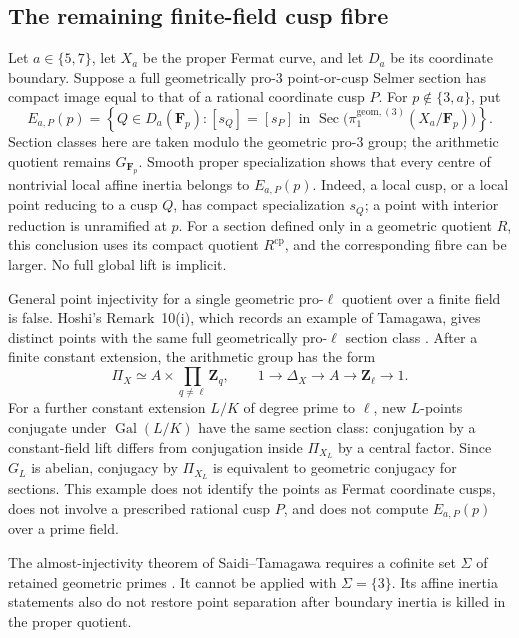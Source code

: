 \subsection{The remaining finite-field cusp fibre}

Let \(a\in\{5,7\}\), let \(X_a\) be the proper Fermat curve, and let
\(D_a\) be its coordinate boundary. Suppose a full geometrically
pro-\(3\) point-or-cusp Selmer section has compact image equal to that
of a rational coordinate cusp \(P\). For \(p\notin\{3,a\}\), put
\[
 E_{a,P}(p)=
 \left\{Q\in D_a(\mathbf F_p):
 [s_Q]=[s_P]\text{ in }
 \operatorname{Sec}\bigl(\pi_1^{\mathrm{geom},(3)}
             (X_a/\mathbf F_p)\bigr)\right\}.
\]
Section classes here are taken modulo the geometric pro-\(3\) group;
the arithmetic quotient remains \(G_{\mathbf F_p}\).
Smooth proper specialization shows that every centre of nontrivial
local affine inertia belongs to \(E_{a,P}(p)\). Indeed, a local cusp,
or a local point reducing to a cusp \(Q\), has compact specialization
\(s_Q\); a point with interior reduction is unramified at \(p\).
For a section defined only in a geometric quotient \(R\), this
conclusion uses its compact quotient \(R^{\mathrm{cp}}\), and the
corresponding fibre can be larger. No full global lift is implicit.

General point injectivity for a single geometric pro-\(\ell\) quotient
over a finite field is false. Hoshi's Remark~10(i), which records an
example of Tamagawa, gives distinct points with the same full
geometrically pro-\(\ell\) section class
\cite[pp.~742--743]{FCHoshi2009}. After a finite constant extension,
the arithmetic group has the form
\[
 \Pi_X\simeq A\times \prod_{q\ne\ell}\mathbf Z_q,\qquad
 1\longrightarrow\Delta_X\longrightarrow A
       \longrightarrow\mathbf Z_\ell\longrightarrow1.
\]
For a further constant extension \(L/K\) of degree prime to \(\ell\),
new \(L\)-points conjugate under \(\operatorname{Gal}(L/K)\) have the
same section class: conjugation by a constant-field lift differs from
conjugation inside \(\Pi_{X_L}\) by a central factor. Since \(G_L\) is
abelian, conjugacy by \(\Pi_{X_L}\) is equivalent to geometric conjugacy
for sections. This example does not identify the points as Fermat
coordinate cusps, does not involve a prescribed rational cusp \(P\),
and does not compute \(E_{a,P}(p)\) over a prime field.

The almost-injectivity theorem of Saidi--Tamagawa requires a cofinite
set \(\Sigma\) of retained geometric primes
\cite[Proposition~1.8(vi)--(vii), Corollary~1.11(iii)]
 {FCSaidiTamagawa2009}.
It cannot be applied with \(\Sigma=\{3\}\). Its affine inertia
statements also do not restore point separation after boundary inertia
is killed in the proper quotient.

